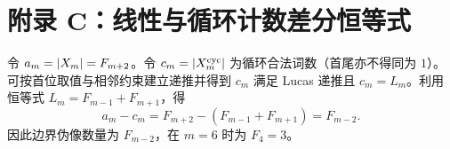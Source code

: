 \section{附录 C：线性与循环计数差分恒等式}
\label{app:linear-cyclic}

令 $a_m=\left\lvert X_m\right\rvert=F_{m+2}$。令 $c_m=\left\lvert X_m^{\mathrm{cyc}}\right\rvert$ 为循环合法词数（首尾亦不得同为 $1$）。可按首位取值与相邻约束建立递推并得到 $c_m$ 满足 Lucas 递推且 $c_m=L_m$。利用恒等式 $L_m=F_{m-1}+F_{m+1}$，得
\[
a_m-c_m=F_{m+2}-(F_{m-1}+F_{m+1})=F_{m-2}.
\]
因此边界伪像数量为 $F_{m-2}$，在 $m=6$ 时为 $F_4=3$。


